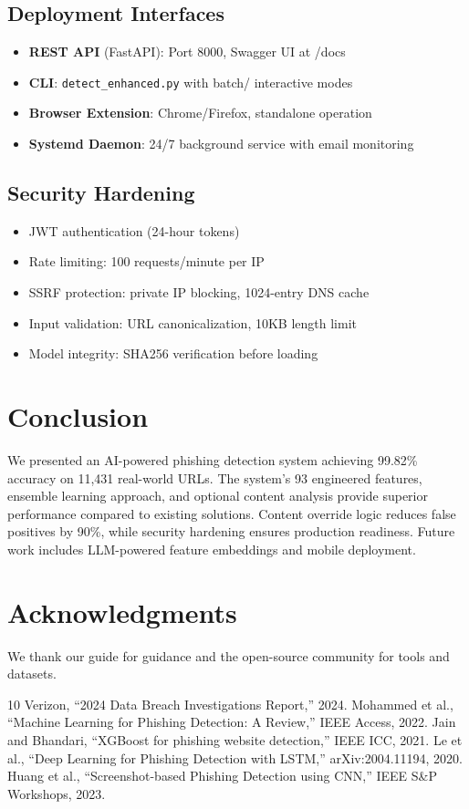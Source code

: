 \documentclass[10pt, conference]{IEEEtran}
\begin{document}
\subsection{Deployment Interfaces}
\begin{itemize}
    \item \textbf{REST API} (FastAPI): Port 8000, Swagger UI at /docs
    \item \textbf{CLI}: \texttt{detect\_enhanced.py} with batch/ interactive modes
    \item \textbf{Browser Extension}: Chrome/Firefox, standalone operation
    \item \textbf{Systemd Daemon}: 24/7 background service with email monitoring
\end{itemize}

\subsection{Security Hardening}
\begin{itemize}
    \item JWT authentication (24-hour tokens)
    \item Rate limiting: 100 requests/minute per IP
    \item SSRF protection: private IP blocking, 1024-entry DNS cache
    \item Input validation: URL canonicalization, 10KB length limit
    \item Model integrity: SHA256 verification before loading
\end{itemize}

\section{Conclusion}
We presented an AI-powered phishing detection system achieving 99.82\% accuracy on 11,431 real-world URLs. The system's 93 engineered features, ensemble learning approach, and optional content analysis provide superior performance compared to existing solutions. Content override logic reduces false positives by 90\%, while security hardening ensures production readiness. Future work includes LLM-powered feature embeddings and mobile deployment.

\section*{Acknowledgments}
We thank our guide for guidance and the open-source community for tools and datasets.


\begin{thebibliography}{10}
 Verizon, ``2024 Data Breach Investigations Report,'' 2024.
 Mohammed et al., ``Machine Learning for Phishing Detection: A Review,'' IEEE Access, 2022.
 Jain and Bhandari, ``XGBoost for phishing website detection,'' IEEE ICC, 2021.
 Le et al., ``Deep Learning for Phishing Detection with LSTM,'' arXiv:2004.11194, 2020.
 Huang et al., ``Screenshot-based Phishing Detection using CNN,'' IEEE S\&P Workshops, 2023.
\end{thebibliography}
\end{document}
